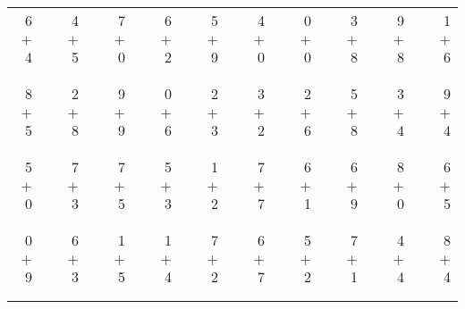 \documentclass[12pt, letterpaper]{article}
\begin{document}
\begin{tabular}{rrrrrrrrrrrrrrrrrrr}
6 & & 4 & & 7 & & 6 & & 5 & & 4 & & 0 & & 3 & & 9 & & 1\\
$+$ 4 & & $+$ 5 & & $+$ 0 & & $+$ 2 & & $+$ 9 & & $+$ 0 & & $+$ 0 & & $+$ 8 & & $+$ 8 & & $+$ 6\\
\cline{1-1} \cline{3-3} \cline{5-5} \cline{7-7} \cline{9-9} \cline{11-11} \cline{13-13} \cline{15-15} \cline{17-17} \cline{19-19} \\ \\
8 & & 2 & & 9 & & 0 & & 2 & & 3 & & 2 & & 5 & & 3 & & 9\\
$+$ 5 & & $+$ 8 & & $+$ 9 & & $+$ 6 & & $+$ 3 & & $+$ 2 & & $+$ 6 & & $+$ 8 & & $+$ 4 & & $+$ 4\\
\cline{1-1} \cline{3-3} \cline{5-5} \cline{7-7} \cline{9-9} \cline{11-11} \cline{13-13} \cline{15-15} \cline{17-17} \cline{19-19} \\ \\
5 & & 7 & & 7 & & 5 & & 1 & & 7 & & 6 & & 6 & & 8 & & 6\\
$+$ 0 & & $+$ 3 & & $+$ 5 & & $+$ 3 & & $+$ 2 & & $+$ 7 & & $+$ 1 & & $+$ 9 & & $+$ 0 & & $+$ 5\\
\cline{1-1} \cline{3-3} \cline{5-5} \cline{7-7} \cline{9-9} \cline{11-11} \cline{13-13} \cline{15-15} \cline{17-17} \cline{19-19} \\ \\
0 & & 6 & & 1 & & 1 & & 7 & & 6 & & 5 & & 7 & & 4 & & 8\\
$+$ 9 & & $+$ 3 & & $+$ 5 & & $+$ 4 & & $+$ 2 & & $+$ 7 & & $+$ 2 & & $+$ 1 & & $+$ 4 & & $+$ 4\\
\cline{1-1} \cline{3-3} \cline{5-5} \cline{7-7} \cline{9-9} \cline{11-11} \cline{13-13} \cline{15-15} \cline{17-17} \cline{19-19} \\ \\
\end{tabular}
\newpage
\end{document}
